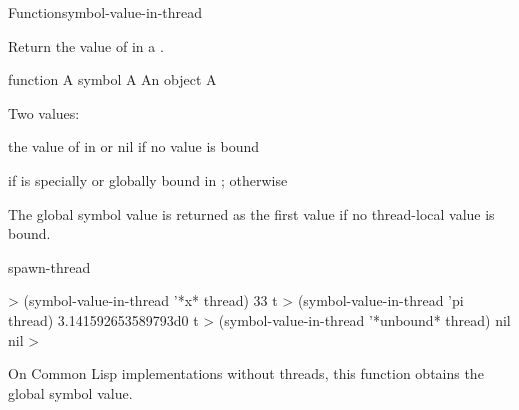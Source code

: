 \documentclass[10pt,twoside,english,pdftex]{article}
\begin{document}
\begin{functiondoc}{Function}{symbol-value-in-thread}{%
    }
%
%

\fnsyntax

\fnpurpose Return the value of  in a .

\fnpackage {}

\fnmodule {}

\fnargs
\begin{args}{function}
\arg[symbol] A symbol
\arg[thread] A 
\arg[object] An object
\arg[boundp] A 
\end{args}

\fnreturns Two values:
\begin{tightitemize}
\item the value of  in  or nil if no value
  is bound
\item {} if  is specially or globally bound in 
  ; otherwise \nil
\end{tightitemize}
  
\fndescription The global symbol value is returned as the first value if no
thread-local value is bound.

\begin{alsos}{spawn-thread}
\end{alsos}

\fnexamples
%
\W\supp
\begin{example}
  > (symbol-value-in-thread '*x* thread)
  33
  t
  > (symbol-value-in-thread 'pi thread)
  3.141592653589793d0
  t
  > (symbol-value-in-thread '*unbound* thread)
  nil
  nil
  >
\end{example}

\fnnote On Common Lisp implementations without threads, this function obtains
the global symbol value.

\end{functiondoc}

\end{document}
